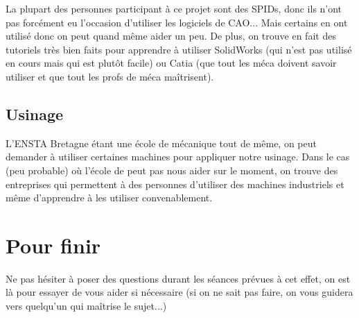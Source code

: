 \documentclass[fleqn,10pt]{SelfArx} %
\begin{document}
La plupart des personnes participant à ce projet sont des SPIDs, donc ils n'ont pas forcément eu l'occasion d'utiliser les logiciels de CAO... Mais certains en ont utilisé donc on peut quand même aider un peu. De plus, on trouve en fait des tutoriels très bien faits pour apprendre à utiliser SolidWorks (qui n'est pas utilisé en cours mais qui est plutôt facile) ou Catia (que tout les méca doivent savoir utiliser et que tout les profs de méca maîtrisent).

\subsection{Usinage}

L'ENSTA Bretagne étant une école de mécanique tout de même, on peut demander à utiliser certaines machines pour appliquer notre usinage. Dans le cas (peu probable) où l'école de peut pas nous aider sur le moment, on trouve des entreprises qui permettent à des personnes d'utiliser des machines industriels et même d'apprendre à les utiliser convenablement.


\section*{Pour finir} %


Ne pas hésiter à poser des questions durant les séances prévues à cet effet, on est là pour essayer de vous aider si nécessaire (si on ne sait pas faire, on vous guidera vers quelqu'un qui maîtrise le sujet...)


\end{document}
